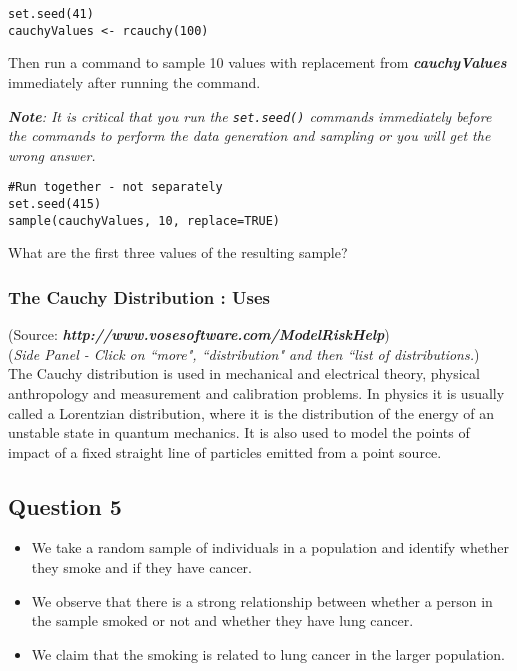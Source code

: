 \documentclass[]{article}
\begin{document}
\begin{framed}
\begin{verbatim}
set.seed(41)
cauchyValues <- rcauchy(100)
\end{verbatim}
\end{framed}

\noindent Then run a command to sample 10 values with replacement from \textit{\textbf{cauchyValues}} immediately after running the command.

\noindent \textit{\textbf{Note}: It is critical that you run the \texttt{set.seed()} commands immediately before the commands to perform the data generation and sampling or you will get the wrong answer.}

\begin{framed}
\begin{verbatim}
#Run together - not separately
set.seed(415)
sample(cauchyValues, 10, replace=TRUE)
\end{verbatim}
\end{framed}

\noindent What are the first three values of the resulting sample?
 


\subsubsection*{The Cauchy Distribution : Uses}
(Source: \textit{\textbf{http://www.vosesoftware.com/ModelRiskHelp}})\\
(\textit{Side Panel - Click on ``more", ``distribution" and then ``list of distributions.})
\\
\vspace{0.5cm}
The Cauchy distribution  is used in mechanical and electrical theory, physical anthropology and measurement and calibration problems. In physics it is usually called a Lorentzian distribution, where it is the distribution of the energy of an unstable state in quantum mechanics. It is also used to model the points of impact of a fixed straight line of particles emitted from a point source.

\newpage
\subsection*{Question 5}
\begin{itemize}
\item We take a random sample of individuals in a population and identify whether they smoke and if they have cancer. 
\item We observe that there is a strong relationship between whether a person in the sample smoked or not and whether they have lung cancer.
\item  We claim that the smoking is related to lung cancer in the larger population.
\end{itemize}
\end{document}
